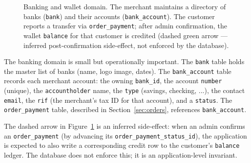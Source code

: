 \documentclass[11pt,a4paper]{article}
\begin{document}
\begin{figure}[htbp]
\centering
{}
\caption{Banking and wallet domain. The merchant maintains a
directory of banks (\texttt{bank}) and their accounts
(\texttt{bank\_account}). The customer reports a transfer via
\texttt{order\_payment}; after admin confirmation, the wallet
\texttt{balance} for that customer is credited (dashed green arrow
--- inferred post-confirmation side-effect, not enforced by the
database).}
\label{fig:banking}
\end{figure}

The banking domain is small but operationally important. The
\texttt{bank} table holds the master list of banks (name, logo
image, dates). The \texttt{bank\_account} table records each
merchant account: the owning \texttt{bank\_id}, the account
\texttt{number} (unique), the \texttt{accountholder} name, the
\texttt{type} (savings, checking, ...), the contact \texttt{email},
the \texttt{rif} (the merchant's tax ID for that account), and a
\texttt{status}. The \texttt{order\_payment} table, described in
Section~\ref{sec:orders}, references \texttt{bank\_account}.

The dashed arrow in Figure~\ref{fig:banking} is an inferred
side-effect: when an admin confirms an \texttt{order\_payment}
(by advancing its \texttt{order\_payment\_status\_id}), the
application is expected to also write a corresponding credit row
to the customer's \texttt{balance} ledger. The database does not
enforce this; it is an application-level invariant.
\end{document}
